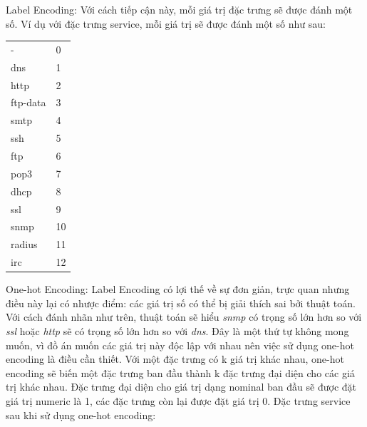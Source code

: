 \begin{itemize}
\ii Label Encoding: Với cách tiếp cận này, mỗi giá trị đặc trưng sẽ được đánh một số. Ví dụ với đặc trưng service, mỗi giá trị sẽ được đánh một số như sau:
\begin{center}
	\begin{tabular}{l | l }
        - & 0\\
        dns & 1\\
        http & 2\\
        ftp-data & 3\\
        smtp & 4\\
        ssh & 5\\
        ftp & 6\\
        pop3 & 7\\
        dhcp & 8\\
        ssl & 9\\
        snmp & 10\\
        radius & 11\\
        irc & 12\\
	\end{tabular}
\end{center} 
\ii One-hot Encoding: Label Encoding có lợi thế về sự đơn giản, trực quan nhưng điều này lại có nhược điểm: các giá trị số có thể bị giải thích sai bởi thuật toán. Với cách đánh nhãn như trên, thuật toán sẽ hiểu \textit{snmp} có trọng số lớn hơn so với \textit{ssl} hoặc \textit{http} sẽ có trọng số lớn hơn so với \textit{dns}. Đây là một thứ tự không mong muốn, vì đồ án muốn các giá trị này độc lập với nhau nên việc sử dụng one-hot encoding là điều cần thiết. Với một đặc trưng có k giá trị khác nhau, one-hot encoding sẽ biến một đặc trưng ban đầu thành k đặc trưng đại diện cho các giá trị khác nhau. Đặc trưng đại diện cho giá trị dạng nominal ban đầu sẽ được đặt giá trị numeric là 1, các đặc trưng còn lại được đặt giá trị 0. Đặc trưng service sau khi sử dụng one-hot encoding:
\end{itemize}
